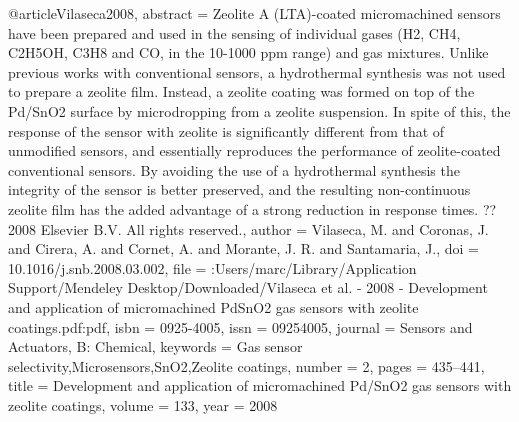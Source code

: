 @article{Vilaseca2008,
abstract = {Zeolite A (LTA)-coated micromachined sensors have been prepared and used in the sensing of individual gases (H2, CH4, C2H5OH, C3H8 and CO, in the 10-1000 ppm range) and gas mixtures. Unlike previous works with conventional sensors, a hydrothermal synthesis was not used to prepare a zeolite film. Instead, a zeolite coating was formed on top of the Pd/SnO2 surface by microdropping from a zeolite suspension. In spite of this, the response of the sensor with zeolite is significantly different from that of unmodified sensors, and essentially reproduces the performance of zeolite-coated conventional sensors. By avoiding the use of a hydrothermal synthesis the integrity of the sensor is better preserved, and the resulting non-continuous zeolite film has the added advantage of a strong reduction in response times. ?? 2008 Elsevier B.V. All rights reserved.},
author = {Vilaseca, M. and Coronas, J. and Cirera, A. and Cornet, A. and Morante, J. R. and Santamaria, J.},
doi = {10.1016/j.snb.2008.03.002},
file = {:Users/marc/Library/Application Support/Mendeley Desktop/Downloaded/Vilaseca et al. - 2008 - Development and application of micromachined PdSnO2 gas sensors with zeolite coatings.pdf:pdf},
isbn = {0925-4005},
issn = {09254005},
journal = {Sensors and Actuators, B: Chemical},
keywords = {Gas sensor selectivity,Microsensors,SnO2,Zeolite coatings},
number = {2},
pages = {435--441},
title = {{Development and application of micromachined Pd/SnO2 gas sensors with zeolite coatings}},
volume = {133},
year = {2008}
}
